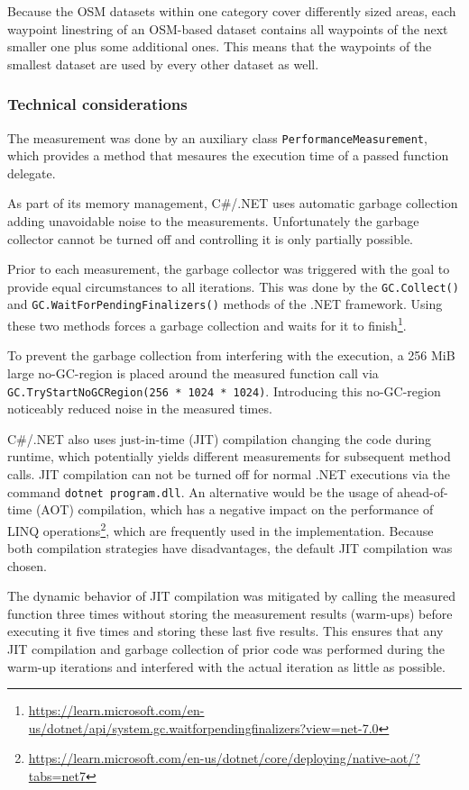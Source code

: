 			Because the OSM datasets within one category cover differently sized areas, each waypoint linestring of an OSM-based dataset contains all waypoints of the next smaller one plus some additional ones.
			This means that the waypoints of the smallest dataset are used by every other dataset as well.
		
		\subsubsection{Technical considerations}
		
			The measurement was done by an auxiliary class \texttt{PerformanceMeasurement}, which provides a method that mesaures the execution time of a passed function delegate.
			
			As part of its memory management, C\#/.NET uses automatic garbage collection adding unavoidable noise to the measurements.
			Unfortunately the garbage collector cannot be turned off and controlling it is only partially possible.
			
			Prior to each measurement, the garbage collector was triggered with the goal to provide equal circumstances to all iterations.
			This was done by the \texttt{GC.Collect()} and \texttt{GC.WaitForPendingFinalizers()} methods of the .NET framework.
			Using these two methods forces a garbage collection and waits for it to finish\footnote{\url{https://learn.microsoft.com/en-us/dotnet/api/system.gc.waitforpendingfinalizers?view=net-7.0}}.
			
			To prevent the garbage collection from interfering with the execution, a 256 MiB large no-GC-region is placed around the measured function call via \texttt{GC.TryStartNoGCRegion(256 * 1024 * 1024)}.
			Introducing this no-GC-region noticeably reduced noise in the measured times.
		
			C\#/.NET also uses just-in-time (JIT) compilation changing the code during runtime, which potentially yields different measurements for subsequent method calls.
			JIT compilation can not be turned off for normal .NET executions via the command \texttt{dotnet program.dll}.
			An alternative would be the usage of ahead-of-time (AOT) compilation, which has a negative impact on the performance of LINQ operations\footnote{\url{https://learn.microsoft.com/en-us/dotnet/core/deploying/native-aot/?tabs=net7}}, which are frequently used in the implementation.
			Because both compilation strategies have disadvantages, the default JIT compilation was chosen.
			
			The dynamic behavior of JIT compilation was mitigated by calling the measured function three times without storing the measurement results (warm-ups) before executing it five times and storing these last five results.
			This ensures that any JIT compilation and garbage collection of prior code was performed during the warm-up iterations and interfered with the actual iteration as little as possible.
			
